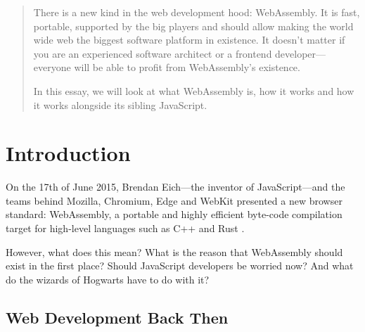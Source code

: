\documentclass[10pt]{article}
\begin{document}
\begin{sloppypar}
  \begin{abstract}
    There is a new kind in the web development hood: WebAssembly. It is fast, portable, supported by the big players and should allow making the world wide web the biggest software platform in existence. It doesn’t matter if you are an experienced software architect or a frontend developer—everyone will be able to profit from WebAssembly’s existence.

    In this essay, we will look at what WebAssembly is, how it works and how it works alongside its sibling JavaScript.
  \end{abstract}

  \pagebreak


  \tableofcontents

  \pagebreak

  \listoffigures

  \pagebreak

  \listoftables

  \pagebreak

  \lstlistoflistings

  \pagebreak



  \section{Introduction}
  \label{sec:introduction}

  On the 17th of June 2015, Brendan Eich—the inventor of JavaScript—and the teams behind Mozilla, Chromium, Edge and WebKit presented a new browser standard: \mbox{WebAssembly}, a portable and highly efficient byte-code compilation target for high-level languages such as C++ and Rust \citep{eich_asmjs_2015}.

  However, what does this mean? What is the reason that WebAssembly should exist in the first place? Should JavaScript developers be worried now? And what do the wizards of Hogwarts have to do with it?

  \subsection{Web Development Back Then}
  \label{sec:back-then}


\end{sloppypar}
\end{document}
